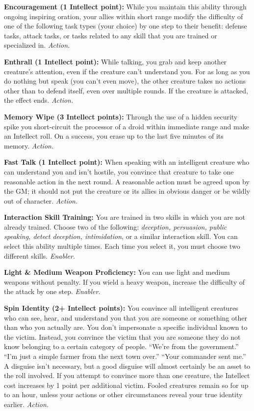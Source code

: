 \documentclass[a4paper,10pt,final,twocolumn,oneside]{book}
\newcommand{\itemAbility}[2]{\textcolor{25gray}{\textbullet\textbf{ #1:}}{ #2}\par}
\newcommand{\enabler}{\textit{ Enabler.}}
\newcommand{\action}{\textit{ Action.}}
\begin{document}
\itemAbility{Encouragement (1 Intellect point)}{While you maintain this ability through ongoing inspiring oration, your allies within short range modify the difficulty of one of the following task types (your choice) by one step to their benefit: defense tasks, attack tasks, or tasks related to any skill that you are trained or specialized in.\action}

\itemAbility{Enthrall (1 Intellect point)}{While talking, you grab and keep another creature’s attention, even if the creature can’t understand you. For as long as you do nothing but speak (you can’t even move), the other creature takes no actions other than to defend itself, even over multiple rounds. If the creature is attacked, the effect ends.\action}

\itemAbility{Memory Wipe (3 Intellect points)}{Through the use of a hidden security spike you short-circuit the processor of a droid within immediate range and make an Intellect roll. On a success, you erase up to the last five minutes of its memory.\action}

\itemAbility{Fast Talk (1 Intellect point)}{When speaking with an intelligent creature who can understand you and isn’t hostile, you convince that creature to take one reasonable action in the next round. A reasonable action must be agreed upon by the GM; it should not put the creature or its allies in obvious danger or be wildly out of character.\action}

\itemAbility{Interaction Skill Training}{You are trained in two skills in which you are not already trained. Choose two of the following: \textit{deception, persuasion, public speaking, detect deception, intimidation}, or a similar interaction skill. You can select this ability multiple times. Each time you select it, you must choose two different skills.\enabler}

\itemAbility{Light \& Medium Weapon Proficiency}{You can use light and medium weapons without penalty. If you wield a heavy weapon, increase the difficulty of the attack by one step.\enabler}

\itemAbility{Spin Identity (2+ Intellect points)}{You convince all intelligent creatures who can see, hear, and understand you that you are someone or something other than who you actually are. You don’t impersonate a specific individual known to the victim. Instead, you convince the victim that you are someone they do not know belonging to a certain category of people. “We’re from the government.” “I’m just a simple farmer from the next town over.” “Your commander sent me.” A disguise isn’t necessary, but a good disguise will almost certainly be an asset to the roll involved. If you attempt to convince more than one creature, the Intellect cost increases by 1 point per additional victim. Fooled creatures remain so for up to an hour, unless your actions or other circumstances reveal your true identity earlier.\action}
\end{document}
